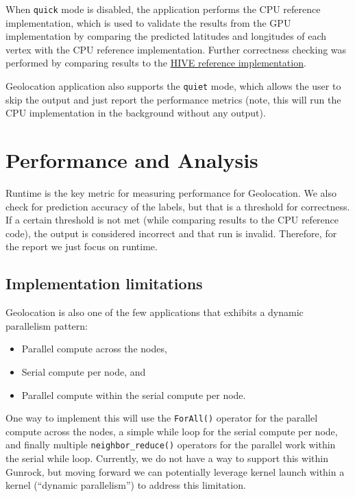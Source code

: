 \documentclass[10pt,oneside]{memoir}
\providecommand{\tightlist}{%
  \setlength{\itemsep}{0pt}\setlength{\parskip}{0pt}}
\begin{document}
When \texttt{quick} mode is disabled, the application performs the CPU
reference implementation, which is used to validate the results from the
GPU implementation by comparing the predicted latitudes and longitudes
of each vertex with the CPU reference implementation. Further
correctness checking was performed by comparing results to the
\href{https://gitlab.hiveprogram.com/ggillary/geotagging.git}{HIVE
reference implementation}.

Geolocation application also supports the \texttt{quiet} mode, which
allows the user to skip the output and just report the performance
metrics (note, this will run the CPU implementation in the background
without any output).

\hypertarget{performance-and-analysis-1}{%
\section{Performance and Analysis}\label{performance-and-analysis-1}}

Runtime is the key metric for measuring performance for Geolocation. We
also check for prediction accuracy of the labels, but that is a
threshold for correctness. If a certain threshold is not met (while
comparing results to the CPU reference code), the output is considered
incorrect and that run is invalid. Therefore, for the report we just
focus on runtime.

\hypertarget{implementation-limitations-1}{%
\subsection{Implementation
limitations}\label{implementation-limitations-1}}

Geolocation is also one of the few applications that exhibits a dynamic
parallelism pattern:

\begin{itemize}
\tightlist
\item
  Parallel compute across the nodes,
\item
  Serial compute per node, and
\item
  Parallel compute within the serial compute per node.
\end{itemize}

One way to implement this will use the \texttt{ForAll()} operator for
the parallel compute across the nodes, a simple while loop for the
serial compute per node, and finally multiple
\texttt{neighbor\_reduce()} operators for the parallel work within the
serial while loop. Currently, we do not have a way to support this
within Gunrock, but moving forward we can potentially leverage kernel
launch within a kernel (``dynamic parallelism'') to address this
limitation.
\end{document}
